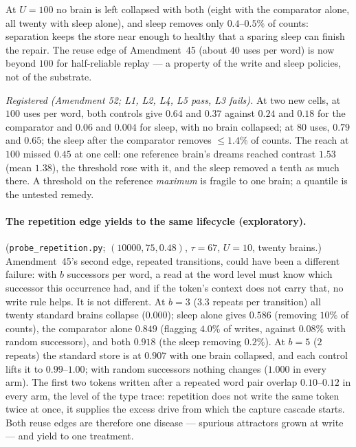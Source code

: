 \documentclass[11pt]{article}
\theoremstyle{definition}
\theoremstyle{plain}
\begin{document}
At $U = 100$ no brain is left collapsed with both (eight with the comparator
alone, all twenty with sleep alone), and sleep removes only $0.4$--$0.5\%$ of
counts: separation keeps the store near enough to healthy that a sparing sleep
can finish the repair. The reuse edge of Amendment~45 (about $40$ uses per
word) is now beyond $100$ for half-reliable replay --- a property of the write
and sleep policies, not of the substrate.

\emph{Registered (Amendment 52; L1, L2, L4, L5 pass, L3 fails).} At two new
cells, at $100$ uses per word, both controls give $0.64$ and $0.37$ against $0.24$
and $0.18$ for the comparator and $0.06$ and $0.004$ for sleep, with no brain
collapsed; at $80$ uses, $0.79$ and $0.65$; the sleep after the comparator removes
$\le 1.4\%$ of counts. The reach at $100$ missed $0.45$ at one cell: one reference
brain's dreams reached contrast $1.53$ (mean $1.38$), the threshold rose with it,
and the sleep removed a tenth as much there. A threshold on the reference
\emph{maximum} is fragile to one brain; a quantile is the untested remedy.

\paragraph{The repetition edge yields to the same lifecycle (exploratory).}
(\texttt{probe\_repetition.py}; $(10000,75,0.48)$, $\tau = 67$, $U = 10$, twenty
brains.) Amendment~45's second edge, repeated transitions, could have been a
different failure: with $b$ successors per word, a read at the word level must
know which successor this occurrence had, and if the token's context does not
carry that, no write rule helps. It is not different. At $b = 3$ ($3.3$ repeats
per transition) all twenty standard brains collapse ($0.000$); sleep alone gives
$0.586$ (removing $10\%$ of counts), the comparator alone $0.849$ (flagging $4.0\%$
of writes, against $0.08\%$ with random successors), and both $0.918$ (the sleep
removing $0.2\%$). At $b = 5$ ($2$ repeats) the standard store is at $0.907$ with
one brain collapsed, and each control lifts it to $0.99$--$1.00$; with random
successors nothing changes ($1.000$ in every arm). The first two tokens written
after a repeated word pair overlap $0.10$--$0.12$ in every arm, the level of the
type trace: repetition does not write the same token twice at once, it
supplies the excess drive from which the capture cascade starts. Both reuse
edges are therefore one disease --- spurious attractors grown at write --- and
yield to one treatment.
\end{document}
